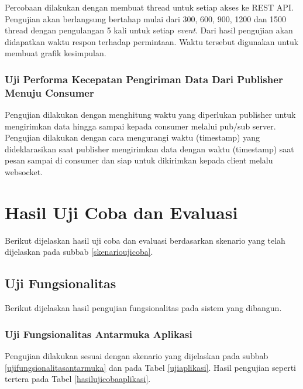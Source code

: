         	Percobaan dilakukan dengan membuat thread untuk setiap akses ke REST API. Pengujian akan berlangsung bertahap mulai dari 300, 600, 900, 1200 dan 1500 thread dengan pengulangan 5 kali untuk setiap \textit{event}. Dari hasil pengujian akan didapatkan waktu respon terhadap permintaan. Waktu tersebut digunakan untuk membuat grafik kesimpulan.
        \subsubsection{Uji Performa Kecepatan Pengiriman Data Dari Publisher Menuju Consumer}
        	Pengujian dilakukan dengan menghitung waktu yang diperlukan publisher untuk mengirimkan data hingga sampai kepada consumer melalui pub/sub server. Pengujian dilakukan dengan cara mengurangi waktu (timestamp) yang dideklarasikan saat publisher mengirimkan data dengan waktu (timestamp) saat pesan sampai di consumer dan siap untuk dikirimkan kepada client melalu websocket.
    
\section{Hasil Uji Coba dan Evaluasi}
	Berikut dijelaskan hasil uji coba dan evaluasi berdasarkan skenario yang telah dijelaskan pada subbab \ref{skenarioujicoba}.
    
	\subsection{Uji Fungsionalitas}
    	Berikut dijelaskan hasil pengujian fungsionalitas pada sistem yang dibangun.
        
        \subsubsection{Uji Fungsionalitas Antarmuka Aplikasi}
    	Pengujian dilakukan sesuai dengan skenario yang dijelaskan pada subbab \ref{ujifungsionalitasantarmuka} dan pada Tabel \ref{ujiaplikasi}. Hasil pengujian seperti tertera pada Tabel \ref{hasilujicobaaplikasi}.
        
